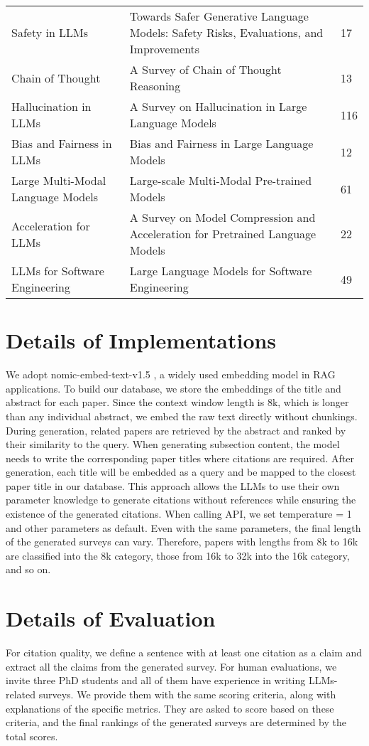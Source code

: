 \begin{table}[h!]
\begin{tabular}{lll}
         Safety in LLMs& Towards Safer Generative Language Models: Safety Risks, Evaluations, and Improvements & 17 \\
         Chain of Thought& A Survey of Chain of Thought Reasoning & 13 \\
         Hallucination in LLMs& A Survey on Hallucination in Large Language Models & 116 \\
         Bias and Fairness in LLMs& Bias and Fairness in Large Language Models & 12 \\
         Large Multi-Modal Language Models& Large-scale Multi-Modal Pre-trained Models & 61 \\
         Acceleration for LLMs& A Survey on Model Compression and Acceleration for Pretrained Language Models & 22 \\
         LLMs for Software Engineering& Large Language Models for Software Engineering & 49 \\
        \bottomrule
    \end{tabular}
    \label{table:topics}
\end{table}

\section{Details of Implementations}
\label{appendix:implementation}
We adopt nomic-embed-text-v1.5 \citep{nussbaum2024nomic}, a widely used embedding model in RAG applications. To build our database, we store the embeddings of the title and abstract for each paper. Since the context window length is 8k, which is longer than any individual abstract, we embed the raw text directly without chunkings. During generation, related papers are retrieved by the abstract and ranked by their similarity to the query. 
When generating subsection content, the model needs to write the corresponding paper titles where citations are required. After generation, each title will be embedded as a query and be mapped to the closest paper title in our database. This approach allows the LLMs to use their own parameter knowledge to generate citations without references while ensuring the existence of the generated citations. When calling API, we set temperature = 1 and other parameters as default. 
Even with the same parameters, the final length of the generated surveys can vary. Therefore, papers with lengths from 8k to 16k are classified into the 8k category, those from 16k to 32k into the 16k category, and so on.

\section{Details of Evaluation}
\label{appendix:evaluation}
For citation quality, we define a sentence with at least one citation as a claim and extract all the claims from the generated survey. For human evaluations, we invite three PhD students and all of them have experience in writing LLMs-related surveys. We provide them with the same scoring criteria, along with explanations of the specific metrics. They are asked to score based on these criteria, and the final rankings of the generated surveys are determined by the total scores. 
